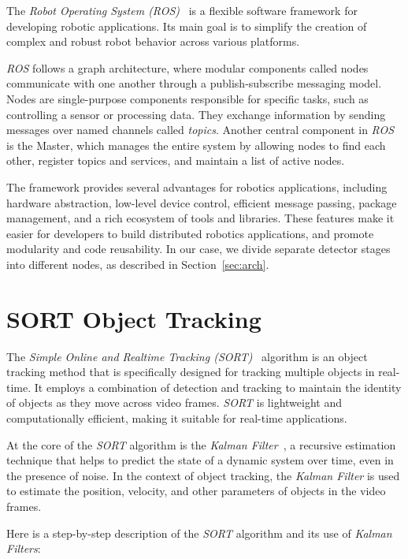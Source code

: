 The \textit{Robot Operating System (ROS)}~\cite{quigley2009ros} is a flexible software framework for developing robotic applications.
Its main goal is to simplify the creation of complex and robust robot behavior across various platforms.

\textit{ROS} follows a graph architecture, where modular components called nodes communicate with one another through a publish-subscribe messaging model.
Nodes are single-purpose components responsible for specific tasks, such as controlling a sensor or processing data.
They exchange information by sending messages over named channels called \textit{topics}.
Another central component in \textit{ROS} is the Master, which manages the entire system by allowing nodes to find each other, register topics and services, and maintain a list of active nodes.

The framework provides several advantages for robotics applications, including hardware abstraction, low-level device control, efficient message passing, package management, and a rich ecosystem of tools and libraries.
These features make it easier for developers to build distributed robotics applications, and promote modularity and code reusability.
In our case, we divide separate detector stages into different nodes, as described in Section~\ref{sec:arch}.

\section{SORT Object Tracking}
\label{sec:sort}

The \textit{Simple Online and Realtime Tracking (SORT)}~\cite{bewley2016simple} algorithm is an object tracking method that is specifically designed for tracking multiple objects in real-time.
It employs a combination of detection and tracking to maintain the identity of objects as they move across video frames.
\textit{SORT} is lightweight and computationally efficient, making it suitable for real-time applications.

At the core of the \textit{SORT} algorithm is the \textit{Kalman Filter}~\cite{welch1995kalman}, a recursive estimation technique that helps to predict the state of a dynamic system over time, even in the presence of noise.
In the context of object tracking, the \textit{Kalman Filter} is used to estimate the position, velocity, and other parameters of objects in the video frames.

Here is a step-by-step description of the \textit{SORT} algorithm and its use of \textit{Kalman Filters}:

